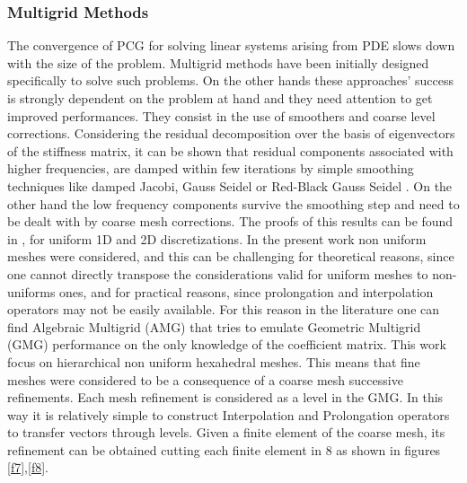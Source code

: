 \subsubsection{Multigrid Methods}
\label{multigrid}
The convergence of PCG for solving linear systems arising from PDE slows down with the size of the problem. Multigrid methods \cite{trottenberg2001multigrid} have been initially designed specifically to solve such problems. On the other hands these approaches' success is strongly dependent on the problem at hand and they need attention to get improved performances. They consist in the use of smoothers and coarse level corrections. 
Considering the residual decomposition over the basis of eigenvectors of the stiffness matrix, it can be shown that residual components associated with higher frequencies, are damped within few iterations by simple smoothing techniques like damped Jacobi, Gauss Seidel or Red-Black Gauss Seidel \cite{saad2003iterative}. On the other hand the low frequency components survive the smoothing step and need to be dealt with by coarse mesh corrections. The proofs of this results can be found in \cite{saad2003iterative}, for uniform 1D and 2D discretizations. In the present work non uniform meshes were considered, and this can be challenging for theoretical reasons, since one cannot directly transpose the considerations valid for uniform meshes to non-uniforms ones, and for practical reasons, since prolongation and interpolation operators may not be easily available. For this reason in the literature one can find Algebraic Multigrid (AMG) \cite{stuben2001review} that tries to emulate Geometric Multigrid (GMG) performance on the only knowledge of the coefficient matrix. This work focus on hierarchical non uniform hexahedral meshes.  This means that fine meshes were considered to be a consequence of a coarse mesh successive refinements. Each mesh refinement is considered as a level in the GMG.
In this way it is relatively simple to construct Interpolation and Prolongation operators to transfer vectors through levels.
Given a finite element of the coarse mesh, its refinement can be obtained cutting each finite element in 8 as shown in figures
\ref{f7},\ref{f8}.  
